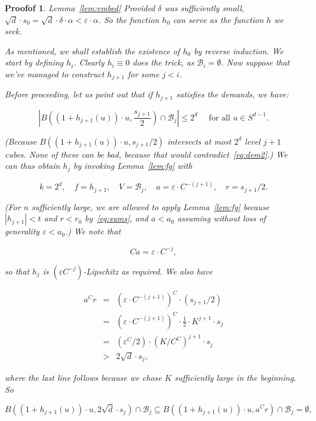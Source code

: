 \documentclass[10pt,a4paper]{amsart}
\newtheorem{proofof}{Proofof}
\newcommand{\Bcal}[0]{\ensuremath{{\mathcal B}}}
\newcommand{\eps}{\varepsilon}
\begin{document}
\begin{proofof}{Lemma~\ref{lem:embed}}
\noindent 
Provided $\delta$ was sufficiently small, $\sqrt{d} \cdot s_0 = \sqrt{d} \cdot 
\delta \cdot \alpha < \eps \cdot \alpha$.
So the function $h_0$ can serve as the function $h$ we seek.

As mentioned, we shall establish the existence of $h_0$ by reverse induction. 
We start by defining $h_i$. Clearly $h_i \equiv 0$ does the trick, as $\Bcal_i=\emptyset$.
Now suppose that we've managed to construct $h_{j+1}$ for some $j < i$.

Before proceeding, let us point out that if $h_{j+1}$ satisfies the demands, we have:

\begin{equation}\label{eq:ballsiplus1}
\left| B\left( (1+h_{j+1}(u))\cdot u, \frac{s_{j+1}}{2}\right) \cap \Bcal_j \right| \leq 2^d \quad 
\text{ for all $u \in S^{d-1}$.} 
\end{equation}

\noindent
(Because $B\left( (1+h_{j+1}(u))\cdot u, s_{j+1}/2\right)$ intersects at most $2^d$ level $j+1$ cubes.
None of these can be bad, because that would contradict~\eqref{eq:dem2}.)
We can thus obtain $h_j$ by invoking Lemma~\ref{lem:fg} with 

$$ k=2^d, \quad f=h_{j+1}, \quad V = \Bcal_j, \quad a = \eps\cdot C^{-(j+1)}, \quad 
r = s_{j+1}/2. $$

\noindent
(For $n$ sufficiently large, we are allowed to apply Lemma~\ref{lem:fg} because
$|h_{j+1}| < t$ and $r < r_0$ by~\eqref{eq:sums}, and 
$a < a_0$ assuming without loss of generality $\eps < a_0$.)
We note that 

$$ Ca = \eps \cdot C^{-j}, $$

\noindent
so that $h_j$ is $(\eps C^{-j})$-Lipschitz as required. We also have 

$$ \begin{array}{rcl} 
a^C r 
& = &\left(\eps \cdot C^{-(j+1)}\right)^C \cdot (s_{j+1}/2) \\
& = & \left(\eps \cdot C^{-(j+1)}\right)^C \cdot \frac12 \cdot K^{j+1} \cdot s_{j} \\
& = & \left(\eps^C/2\right) \cdot \left(K/C^C\right)^{j+1} \cdot s_{j} \\
& > & 2\sqrt{d} \cdot s_j,
\end{array} $$

\noindent
where the last line follows because we chose $K$ sufficiently large in the beginning.
So 

$$B\left( (1+h_{j+1}(u))\cdot u, 2\sqrt{d} \cdot s_j\right) \cap \Bcal_j 
\subseteq B\left( (1+h_{j+1}(u))\cdot u, a^C r \right) \cap \Bcal_j 
= \emptyset, $$


\end{proofof}
\end{document}
